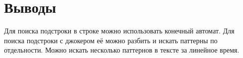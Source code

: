 \section{Выводы}
Для поиска подстроки в строке можно использовать конечный автомат. Для поиска подстроки с джокером её можно разбить и искать паттерны по отдельности. Можно искать несколько паттернов в тексте за линейное время.
\pagebreak
